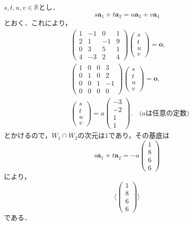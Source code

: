 \documentclass[a4paper,10pt,fleqn]{ltjsarticle}
\begin{document}
\begin{tleftbar}
  $s,t,u,v \in \mathbb{R}$とし．
  \[
    s\bm{a}_1+t\bm{a}_2=u\bm{a}_3+v\bm{a}_4
  \]
  とおく．これにより，
  \begin{align*}
     &
    \begin{pmatrix}
      1 & -1 & 0  & 1 \\
      2 & 1  & -1 & 9 \\
      0 & 3  & 5  & 1 \\
      4 & -3 & 2  & 4
    \end{pmatrix}
    \begin{pmatrix}
      s \\
      t \\
      u \\
      v
    \end{pmatrix}
    =\bm{o} , \\
     &
    \begin{pmatrix}
      1 & 0 & 0 & 3  \\
      0 & 1 & 0 & 2  \\
      0 & 0 & 1 & -1 \\
      0 & 0 & 0 & 0
    \end{pmatrix}
    \begin{pmatrix}
      s \\
      t \\
      u \\
      v
    \end{pmatrix}
    =\bm{o} , \\
     &
    \begin{pmatrix}
      s \\
      t \\
      u \\
      v
    \end{pmatrix}
    =a
    \begin{pmatrix}
      -3 \\
      -2 \\
      1  \\
      1
    \end{pmatrix}
    . \quad \text{($a$は任意の定数)}
  \end{align*}
  とかけるので，$W_1 \cap W_2$の次元は$1$であり，その基底は
  \[
    s \bm{a}_1+ t \bm{a}_2 =-a \begin{pmatrix} 1 \\ 8 \\ 6 \\ 6 \end{pmatrix}
  \]
  により，
  \[
    \langle
    \begin{pmatrix}
      1 \\
      8 \\
      6 \\
      6
    \end{pmatrix}
    \rangle
  \]
  である．
\end{tleftbar}
\newpage
\end{document}
